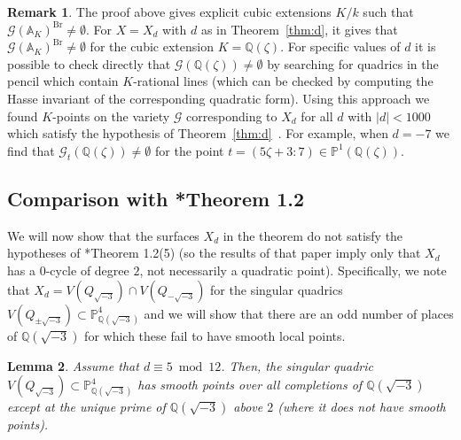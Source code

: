 \documentclass[12pt, reqno]{amsart}
\newtheorem{lemma}{Lemma}
\theoremstyle{definition}
\newtheorem{rmk}[lemma]{Remark}
\newcommand{\A}{{\mathbb A}}
\newcommand{\PP}{{\mathbb P}}
\newcommand{\Q}{{\mathbb Q}}
\newcommand{\calG}{{\mathcal G}}
\DeclareMathOperator{\Br}{Br}
\begin{document}
\begin{rmk}
	The proof above gives explicit cubic extensions $K/k$ such that $\calG(\A_K)^{\Br} \ne \emptyset$. For $X=X_d$ with $d$ as in Theorem~\ref{thm:d}, it gives that $\calG(\A_K)^{\Br} \ne \emptyset$ for the cubic extension $K = \Q(\zeta)$. For specific values of $d$ it is possible to check directly that $\calG(\Q(\zeta)) \ne \emptyset$ by searching for quadrics in the pencil which contain $K$-rational lines (which can be checked by computing the Hasse invariant of the corresponding quadratic form). Using this approach we found $K$-points on the variety $\calG$ corresponding to $X_d$ for all $d$ with $|d|<1000$ which satisfy the hypothesis of Theorem~\ref{thm:d}~\cite{code}. For example, when $d = -7$ we find that $\calG_t(\Q(\zeta)) \ne \emptyset$ for the point $t = ( 5\zeta + 3 : 7) \in \PP^1(\Q(\zeta))$.
\end{rmk}


\subsection{Comparison with \cite{CV}*{Theorem 1.2}}\label{sec:CompareToCV}

We will now show that the surfaces $X_d$ in the theorem do not satisfy the hypotheses of \cite{CV}*{Theorem 1.2(5)} (so the results of that paper imply only that \(X_d\) has a $0$-cycle of degree $2$, not necessarily a quadratic point). Specifically, we note that $X_d = V(Q_{\sqrt{-3}}) \cap V(Q_{-{\sqrt{-3}}})$ for the singular quadrics $V(Q_{\pm{\sqrt{-3}}}) \subset \PP^4_{\Q({\sqrt{-3}})}$ and we will show that there are an odd number of places of \(\Q({\sqrt{-3}})\) for which these fail to have smooth local points.

\begin{lemma}\label{lem:compare}
	Assume that \(d\equiv 5 \bmod 12\). Then, the singular quadric $V(Q_{\sqrt{-3}}) \subset \PP^4_{\Q({\sqrt{-3}})}$ has smooth points over all completions of $\Q({\sqrt{-3}})$ except at the unique prime of $\Q({\sqrt{-3}})$ above $2$ (where it does not have smooth points).
\end{lemma}	
\end{document}
